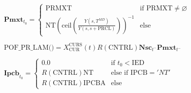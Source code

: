 \documentclass[10pt,a4paper,twoside]{article}
\begin{document}
$\boxed{
    \mathbf{Pmxt}_{t_0} = 
    \begin{cases}
        \text{PRMXT} & \text{if } \text{PRMXT} \neq \varnothing \\
        \text{NT} \left( \text{ceil}\left(\frac{Y(s, T^{MD})}{Y(s, s+\text{PRCL})}\right) \right)^{-1} & \text{else}
    \end{cases}
}$

$\boxed{
    \text{POF\_PR\_LAM()} = X_{\text{CUR}}^{\text{CURS}}(t) R(\text{CNTRL}) \mathbf{Nsc}_{t^{-}} \mathbf{Pmxt}_{t^{-}}
}$

$\boxed{
    \mathbf{Ipcb}_{t_0} = 
    \begin{cases}
        0.0 & \text{if } t_0 < \text{IED} \\
        R(\text{CNTRL})\text{NT} & \text{else if } \text{IPCB} = 'NT' \\
        R(\text{CNTRL})\text{IPCBA} & \text{else}
    \end{cases}
}$
\end{document}
